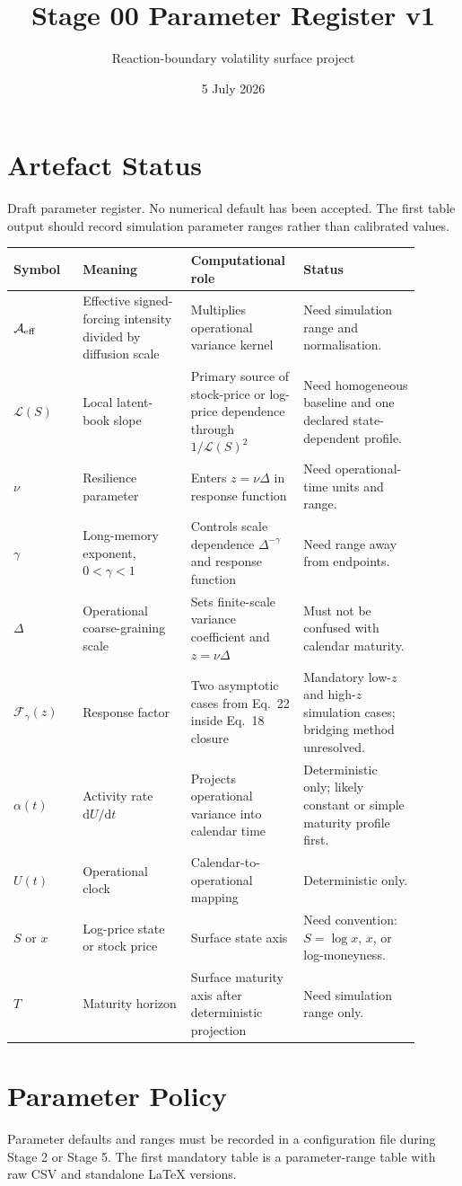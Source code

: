 \documentclass[11pt]{article}
\title{Stage 00 Parameter Register v1}
\author{Reaction-boundary volatility surface project}
\date{5 July 2026}
\begin{document}
\maketitle

\section*{Artefact Status}
Draft parameter register. No numerical default has been accepted. The
first table output should record simulation parameter ranges rather than
calibrated values.

\begin{longtable}{p{0.16\linewidth}p{0.25\linewidth}p{0.22\linewidth}p{0.27\linewidth}}
\toprule
Symbol & Meaning & Computational role & Status \\
\midrule
\(\mathcal A_{\rm eff}\) & Effective signed-forcing intensity divided by diffusion scale & Multiplies operational variance kernel & Need simulation range and normalisation. \\
\(\mathcal L(S)\) & Local latent-book slope & Primary source of stock-price or log-price dependence through \(1/\mathcal L(S)^2\) & Need homogeneous baseline and one declared state-dependent profile. \\
\(\nu\) & Resilience parameter & Enters \(z=\nu\Delta\) in response function & Need operational-time units and range. \\
\(\gamma\) & Long-memory exponent, \(0<\gamma<1\) & Controls scale dependence \(\Delta^{-\gamma}\) and response function & Need range away from endpoints. \\
\(\Delta\) & Operational coarse-graining scale & Sets finite-scale variance coefficient and \(z=\nu\Delta\) & Must not be confused with calendar maturity. \\
\(\mathcal F_\gamma(z)\) & Response factor & Two asymptotic cases from Eq.~22 inside Eq.~18 closure & Mandatory low-\(z\) and high-\(z\) simulation cases; bridging method unresolved. \\
\(\alpha(t)\) & Activity rate \(\mathrm dU/\mathrm dt\) & Projects operational variance into calendar time & Deterministic only; likely constant or simple maturity profile first. \\
\(U(t)\) & Operational clock & Calendar-to-operational mapping & Deterministic only. \\
\(S\) or \(x\) & Log-price state or stock price & Surface state axis & Need convention: \(S=\log x\), \(x\), or log-moneyness. \\
\(T\) & Maturity horizon & Surface maturity axis after deterministic projection & Need simulation range only. \\
\bottomrule
\end{longtable}

\section*{Parameter Policy}
Parameter defaults and ranges must be recorded in a configuration file
during Stage 2 or Stage 5. The first mandatory table is a parameter-range
table with raw CSV and standalone LaTeX versions.
\end{document}
